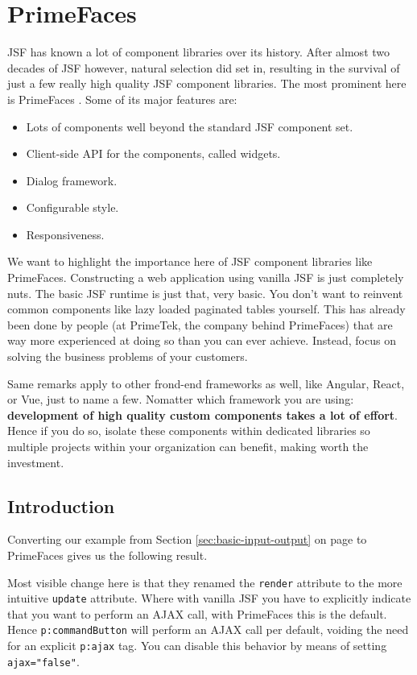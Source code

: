 %

\chapter{PrimeFaces}

JSF has known a lot of component libraries over its history.
After almost two decades of JSF however, natural selection did set in,
resulting in the survival of just a few really high quality JSF component libraries.
The most prominent here is PrimeFaces \cite{PrimeFaces}.
Some of its major features are:
\begin{itemize}
	\item Lots of components well beyond the standard JSF component set.
	\item Client-side API for the components, called widgets.
	\item Dialog framework.
	\item Configurable style.
	\item Responsiveness.
\end{itemize}
We want to highlight the importance here of JSF component libraries like PrimeFaces.
Constructing a web application using vanilla JSF is just completely nuts.
The basic JSF runtime is just that, very basic.
You don't want to reinvent common components like lazy loaded paginated tables yourself.
This has already been done by people (at PrimeTek, the company behind PrimeFaces) that are way more experienced at doing so than you can ever achieve.
Instead, focus on solving the business problems of your customers.

Same remarks apply to other frond-end frameworks as well, like Angular, React, or Vue, just to name a few.
Nomatter which framework you are using: \textbf{development of high quality custom components takes a lot of effort}.
Hence if you do so, isolate these components within dedicated libraries so multiple projects within your organization can benefit, making worth the investment.


\section{Introduction}
Converting our  example from Section \ref{sec:basic-input-output}  on page \pageref{sec:basic-input-output} to PrimeFaces gives us the following result.

Most visible change here is that they renamed the \texttt{render} attribute to the more intuitive \texttt{update} attribute.
Where with vanilla JSF you have to explicitly indicate that you want to perform an AJAX call, with PrimeFaces this is the default.
Hence \texttt{p:commandButton} will perform an AJAX call per default, voiding the need for an explicit \texttt{p:ajax} tag.
You can disable this behavior by means of setting \texttt{ajax="false"}.

